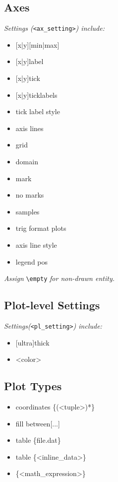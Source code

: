 \subsection*{Axes}
\textit{Settings (}\texttt{<ax\_setting>}\textit{) include:}\\
\begin{multicols}{2}
{\footnotesize 
\begin{itemize}[label={}]
    \item {[x|y]}[min|max]
    \item {[x|y]}label
    \item {[x|y]}tick
    \item {[x|y]}ticklabels
    \item tick label style
    \item axis lines
    \item grid
    \item domain
    \item mark
    \item no marks
    \item samples
    \item {\scriptsize trig format plots}
    \item {\scriptsize axis line style}
    \item {\scriptsize legend pos}
\end{itemize}
}
\end{multicols}

\textit{Assign } \texttt{\textbackslash empty} \textit{ for non-drawn entity.}\\

\subsection*{Plot-level Settings}

\textit{Settings(}\texttt{<pl\_setting>}\textit{) include:}\\
{\begin{multicols}{2}
\begin{itemize}[label={}]
    \item {[ultra]thick}
    \item <color>
\end{itemize}
\end{multicols}}



\subsection*{Plot Types}

\begin{itemize}[label={}]
    \item coordinates \{(<tuple>)*\}
    \item fill between[...]
    \item table \{file.dat\}
    \item table \{<inline\_data>\}
    \item \{<math\_expression>\}
\end{itemize}

